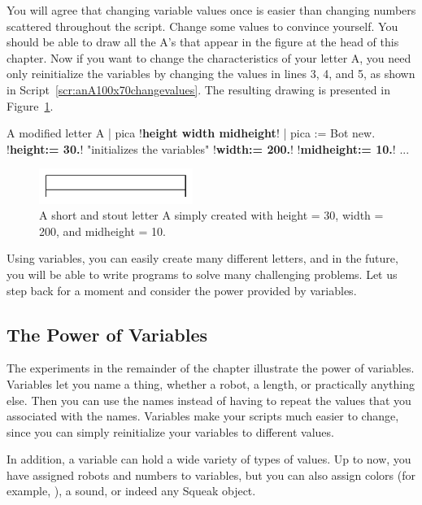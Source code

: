 \documentclass[a4paper,10pt,twoside]{book}
\begin{document}
You will agree that changing variable values once is easier than changing numbers scattered throughout the script. Change some values to convince yourself. You should be able to draw all the A’s that appear in the figure at the head of this chapter. Now if you want to change the characteristics of your letter A, you need only reinitialize the variables by changing the values in lines 3, 4, and 5, as shown in Script~\ref{scr:anA100x70changevalues}. The resulting drawing is presented in Figure~\ref{fig:varaflat}. 

\begin{script}{A modified letter A}
| pica !\textbf{height width midheight}! | 
pica := Bot new. 
!\textbf{height:= 30.}!       "initializes the variables" 
!\textbf{width:= 200.}! 
!\textbf{midheight:= 10.}! 
... 
\end{script}


\begin{figure}[h!]
\centering\includegraphics[width=5cm]{varAFlat}
\caption{A short and stout letter A simply created with height = 30, width = 200, and midheight = 10.\label{fig:varaflat}}
\end{figure}

Using variables, you can easily create many different letters, and in the future, you will be able to write programs to solve many challenging problems. Let us step back for a moment and consider the power provided by variables.

\subsection{The Power of Variables}

The experiments in the remainder of the chapter illustrate the power of variables. Variables let 
you name a thing, whether a robot, a length, or practically anything else. Then you can use the 
names instead of having to repeat the values that you associated with the names. Variables 
make your scripts much easier to change, since you can simply reinitialize your variables to 
different values. 


In addition, a variable can hold a wide variety of types of values. Up to now, you have assigned robots and numbers to variables, but you can also assign colors (for example, ), a sound, or indeed any Squeak object. 
\end{document}
